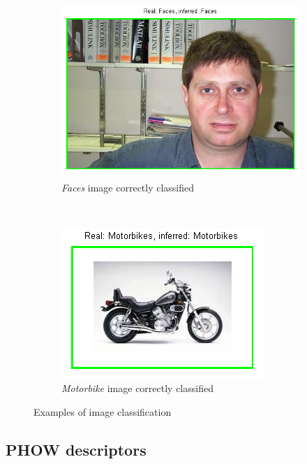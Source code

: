 \begin{figure}[htb]
	\begin{subfigure}[t]{0.4\textwidth}
		\includegraphics[width=\textwidth]{./img/ex1/faces.png}
		\caption{\emph{Faces} image correctly classified}
	\end{subfigure}
	~
	\begin{subfigure}[t]{0.4\textwidth}
		\includegraphics[width=\textwidth]{./img/ex1/motorbike.png}
		\caption{\emph{Motorbike} image correctly classified}
	\end{subfigure}
	
\caption{Examples of image classification}
\label{fig:examples-of-image-classification}
\end{figure}

\subsection{PHOW descriptors}

